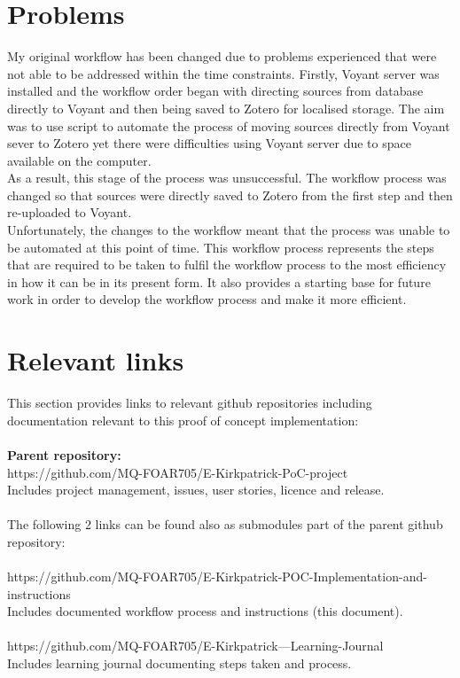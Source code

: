 \documentclass{article}
\begin{document}
\section{Problems}
My original workflow has been changed due to problems experienced that were not able to be addressed within the time constraints. Firstly, Voyant server was installed and the workflow order began with directing sources from database directly to Voyant and then being saved to Zotero for localised storage. The aim was to use script to automate the process of moving sources directly from Voyant sever to Zotero yet there were difficulties using Voyant server due to space available on the computer.\\
As a result, this stage of the process was unsuccessful. The workflow process was changed so that sources were directly saved to Zotero from the first step and then re-uploaded to Voyant. \\
Unfortunately, the changes to the workflow meant that the process was unable to be automated at this point of time. This workflow process represents the steps that are required to be taken to fulfil the workflow process to the most efficiency in how it can be in its present form. It also provides a starting base for future work in order to develop the workflow process and make it more efficient.\\

\section{Relevant links}
This section provides links to relevant github repositories including documentation relevant to this proof of concept implementation:\\
\\
\textbf{Parent repository:}\\
https://github.com/MQ-FOAR705/E-Kirkpatrick-PoC-project\\
Includes project management, issues, user stories, licence and release.\\
\\
The following 2 links can be found also as submodules part of the parent github repository:\\
\\
https://github.com/MQ-FOAR705/E-Kirkpatrick-POC-Implementation-and-instructions\\
Includes documented workflow process and instructions (this document).\\
\\
https://github.com/MQ-FOAR705/E-Kirkpatrick---Learning-Journal\\
Includes learning journal documenting steps taken and process.
\end{document}
